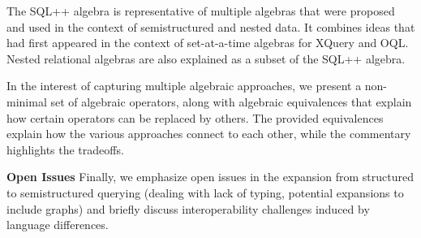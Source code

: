 The SQL++ algebra is representative of multiple algebras that were proposed and used in the context of semistructured and nested data. It combines ideas that had first appeared in the context of set-at-a-time algebras for XQuery and OQL. Nested relational algebras are also explained as a subset of the SQL++ algebra.%

In the interest of capturing multiple algebraic approaches, we present a non-minimal set of algebraic operators, along with algebraic equivalences that explain how certain operators can be replaced by others. The provided equivalences explain how the various approaches connect to each other, while the commentary highlights the tradeoffs.

\noindent \textbf{Open Issues} Finally, we emphasize open issues in the expansion from structured to semistructured querying (dealing with lack of typing, potential expansions to include graphs) and briefly discuss interoperability challenges induced by language differences.

